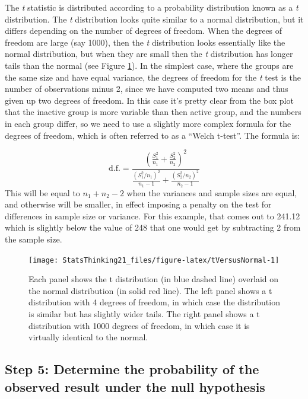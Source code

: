 \documentclass[
  12pt,
]{book}
\begin{document}
The \emph{t} statistic is distributed according to a probability distribution known as a \emph{t} distribution. The \emph{t} distribution looks quite similar to a normal distribution, but it differs depending on the number of degrees of freedom. When the degrees of freedom are large (say 1000), then the \emph{t} distribution looks essentially like the normal distribution, but when they are small then the \emph{t} distribution has longer tails than the normal (see Figure \ref{fig:tVersusNormal}). In the simplest case, where the groups are the same size and have equal variance, the degrees of freedom for the \emph{t} test is the number of observations minus 2, since we have computed two means and thus given up two degrees of freedom. In this case it's pretty clear from the box plot that the inactive group is more variable than then active group, and the numbers in each group differ, so we need to use a slightly more complex formula for the degrees of freedom, which is often referred to as a ``Welch t-test''. The formula is:

\[
 \mathrm{d.f.} = \frac{\left(\frac{S_1^2}{n_1} + \frac{S_2^2}{n_2}\right)^2}{\frac{\left(S_1^2/n_1\right)^2}{n_1-1} + \frac{\left(S_2^2/n_2\right)^2}{n_2-1}}
\]
This will be equal to \(n_1 + n_2 - 2\) when the variances and sample sizes are equal, and otherwise will be smaller, in effect imposing a penalty on the test for differences in sample size or variance. For this example, that comes out to 241.12 which is slightly below the value of 248 that one would get by subtracting 2 from the sample size.

\begin{figure}
\texttt{[image: StatsThinking21\_files/figure-latex/tVersusNormal-1]} \caption{Each panel shows the t distribution (in blue dashed line) overlaid on the normal distribution (in solid red line).  The left panel shows a t distribution with 4 degrees of freedom, in which case the distribution is similar but has slightly wider tails.  The right panel shows a t distribution with 1000 degrees of freedom, in which case it is virtually identical to the normal.}\label{fig:tVersusNormal}
\end{figure}

\hypertarget{step-5-determine-the-probability-of-the-observed-result-under-the-null-hypothesis}{%
\subsection{Step 5: Determine the probability of the observed result under the null hypothesis}\label{step-5-determine-the-probability-of-the-observed-result-under-the-null-hypothesis}}
\end{document}
